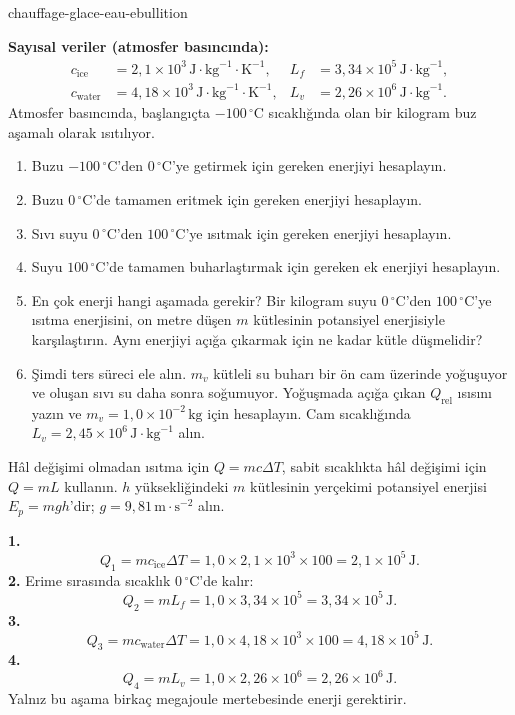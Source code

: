 
\begin{exo}{chauffage-glace-eau-ebullition}

\textbf{Sayısal veriler (atmosfer basıncında):}
\[
\begin{aligned}
c_{\text{ice}} &= 2{,}1\times10^3\,\text{J}\!\cdot\!\text{kg}^{-1}\!\cdot\!\text{K}^{-1},
& L_f &= 3{,}34\times10^5\,\text{J}\!\cdot\!\text{kg}^{-1},\\
c_{\text{water}} &= 4{,}18\times10^3\,\text{J}\!\cdot\!\text{kg}^{-1}\!\cdot\!\text{K}^{-1},
& L_v &= 2{,}26\times10^6\,\text{J}\!\cdot\!\text{kg}^{-1}.
\end{aligned}
\]
Atmosfer basıncında, başlangıçta $-100\,{}^\circ\text{C}$ sıcaklığında olan bir kilogram buz aşamalı olarak ısıtılıyor.
\begin{enumerate}
  \item Buzu $-100\,{}^\circ\text{C}$'den $0\,{}^\circ\text{C}$'ye getirmek için gereken enerjiyi hesaplayın.
  \item Buzu $0\,{}^\circ\text{C}$'de tamamen eritmek için gereken enerjiyi hesaplayın.
  \item Sıvı suyu $0\,{}^\circ\text{C}$'den $100\,{}^\circ\text{C}$'ye ısıtmak için gereken enerjiyi hesaplayın.
  \item Suyu $100\,{}^\circ\text{C}$'de tamamen buharlaştırmak için gereken ek enerjiyi hesaplayın.
  \item En çok enerji hangi aşamada gerekir? Bir kilogram suyu $0\,{}^\circ\text{C}$'den $100\,{}^\circ\text{C}$'ye ısıtma enerjisini, on metre düşen $m$ kütlesinin potansiyel enerjisiyle karşılaştırın. Aynı enerjiyi açığa çıkarmak için ne kadar kütle düşmelidir?
  \item Şimdi ters süreci ele alın. $m_v$ kütleli su buharı bir ön cam üzerinde yoğuşuyor ve oluşan sıvı su daha sonra soğumuyor. Yoğuşmada açığa çıkan $Q_{\text{rel}}$ ısısını yazın ve $m_v=1{,}0\times10^{-2}\,\text{kg}$ için hesaplayın. Cam sıcaklığında $L_v=2{,}45\times10^6\,\text{J}\!\cdot\!\text{kg}^{-1}$ alın.
\end{enumerate}
\begin{indication}
Hâl değişimi olmadan ısıtma için $Q=mc\Delta T$, sabit sıcaklıkta hâl değişimi için $Q=mL$ kullanın. $h$ yüksekliğindeki $m$ kütlesinin yerçekimi potansiyel enerjisi $E_p=mgh$'dir; $g=9{,}81\,\text{m}\!\cdot\!\text{s}^{-2}$ alın.
\end{indication}
\begin{solution}
\textbf{1.}
\[
Q_1=mc_{\text{ice}}\Delta T
=1{,}0\times2{,}1\times10^3\times100=2{,}1\times10^5\,\text{J}.
\]
\textbf{2.} Erime sırasında sıcaklık $0\,{}^\circ\text{C}$'de kalır:
\[
Q_2=mL_f=1{,}0\times3{,}34\times10^5=3{,}34\times10^5\,\text{J}.
\]
\textbf{3.}
\[
Q_3=mc_{\text{water}}\Delta T
=1{,}0\times4{,}18\times10^3\times100=4{,}18\times10^5\,\text{J}.
\]
\textbf{4.}
\[
Q_4=mL_v=1{,}0\times2{,}26\times10^6=2{,}26\times10^6\,\text{J}.
\]
Yalnız bu aşama birkaç megajoule mertebesinde enerji gerektirir.


\end{solution}
\end{exo}
